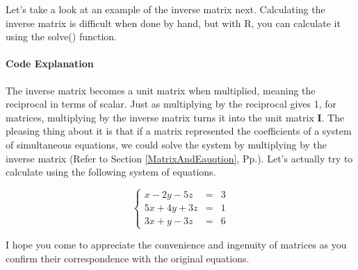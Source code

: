 \documentclass{ltjsbook}
\begin{document}
Let's take a look at an example of the inverse matrix next. Calculating the inverse matrix is difficult when done by hand, but with R, you can calculate it using the solve() function.


\paragraph{Code Explanation}


The inverse matrix becomes a unit matrix when multiplied, meaning the reciprocal in terms of scalar. Just as multiplying by the reciprocal gives 1, for matrices, multiplying by the inverse matrix turns it into the unit matrix $\bm{I}$.
The pleasing thing about it is that if a matrix represented the coefficients of a system of simultaneous equations, we could solve the system by multiplying by the inverse matrix (Refer to Section \ref{MatrixAndEauqtion}, Pp.\pageref{MatrixAndEauqtion}).
Let's actually try to calculate using the following system of equations.

\[
	\left \{
	\begin{array}{lcl}
		x-2y-5z  & = & 3 \\
		5x+4y+3z & = & 1 \\
		3x+y-3z  & = & 6
	\end{array}
	\right .
\]




I hope you come to appreciate the convenience and ingenuity of matrices as you confirm their correspondence with the original equations.

\end{document}

